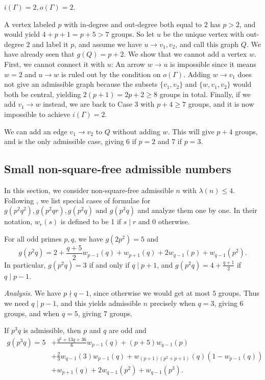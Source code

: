  $i(\Gamma) = 2, o(\Gamma) = 2$.

A vertex labeled $p$ with in-degree and out-degree both equal to $2$ has $p > 2$, and would yield $4 + p + 1 = p + 5 > 7$ groups.
So let $u$ be the unique vertex with out-degree $2$ and label it $p$, and assume we have $u \rightarrow v_1, v_2$, and call this graph $Q$.
We have already seen that $g(Q) = p + 2$.
We show that we cannot add a vertex $w$.
First, we cannot connect it with $u$: An arrow $w \rightarrow u$ is impossible since it means $w = 2$
 and $u \rightarrow w$ is ruled out by the condition on $o(\Gamma)$.
Adding $w \rightarrow v_1$ does not give an admissible graph
because the subsets $\{v_1, v_2\}$ and $\{w, v_1, v_2\}$ would both be central, yielding $2(p + 1) = 2p + 2 \ge 8$ groups in total.
Finally, if we add $v_1 \rightarrow w$ instead, we are back to Case $3$ with $p + 4 \ge 7$ groups, and it is now impossible to achieve $i(\Gamma) = 2$.

We can add an edge $v_1 \rightarrow v_2$ to $Q$ without adding $w$.
This will give $p + 4$ groups, and is the only admissible case, giving $6$ if $p = 2$ and $7$ if $p = 3$.

\subsection{Small non-square-free admissible numbers}
In this section, we consider non-square-free admissible $n$ with $\lambda(n) \le 4$.
Following {\cite{bettinafour1}}, we list special cases of formulae for $g(p^2 q^2), g(p^2 q r), g(p^2 q) \text{ and } g(p^3 q)$ and analyze them one by one.
In their notation, $w_r(s)$ is defined to be 1 if $s \mid r$ and 0 otherwise.


\begin{eufact}
	For all odd primes $p, q$, we have $g(2p^2) = 5$ and \[g(p^2 q) = 2 + \frac{q + 5}{2} w_{p - 1}(q) + w_{p + 1}(q) + 2w_{q - 1}(p) + w_{q - 1}(p^2).\]
	In particular, $g(p^2 q) = 3$ if and only if $q \mid p + 1$, and $g(p^2 q) = 4 + \frac{q + 1}{2}$ if $q \mid p - 1$.
\end{eufact}

\textit{Analysis.} We have $p \nmid q - 1$, since otherwise we would get at most $5$ groups.
Thus we need $q \mid p - 1$, and this yields admissible $n$ precisely when $q = 3$, giving $6$ groups, and when $q = 5$, giving $7$ groups.

\begin{eufact}
	If $p^3 q$ is admissible, then $p$ and $q$ are odd and
	$$\begin{aligned}
		g(p^3 q) = 5 &+ \frac{q^2 + 13q + 36}{6} w_{p - 1}(q) + (p + 5) w_{q - 1}(p) \\
		&+ \frac{2}{3} w_{q - 1}(3)w_{p - 1}(q) + w_{(p + 1)(p^2 + p + 1)}(q) (1 - w_{p - 1}(q)) \\
		&+ w_{p + 1}(q) + 2 w_{q - 1}(p^2) + w_{q - 1}(p^3).
	\end{aligned}$$
\end{eufact}

